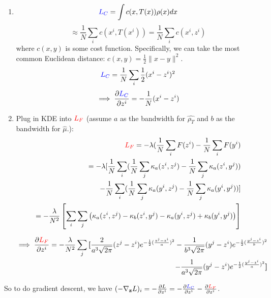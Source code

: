 \documentclass[11pt]{article}
\begin{document}
\begin{enumerate}
    \begin{enumerate}
        \item 
        $$
        \textcolor{blue}{L_C} = \int c(x,T(x)) \rho(x) dx
        $$
        $$
        \approx \frac{1}{N} \sum_i c(x^i,T(x^i))
        = \frac{1}{N} \sum_i c(x^i,z^i)
        $$
        where $c(x,y)$ is some cost function. Specifically, we can take the most common Euclidean distance: $c(x,y) = \frac{1}{2} \|x-y\|^2$.
        $$
        \textcolor{blue}{L_C} = \frac{1}{N} \sum_i \frac{1}{2}(x^i-z^i)^2
        $$
        \begin{align*}
            \implies \frac{\partial \textcolor{blue}{L_C}}{\partial z^i}
            = - \frac{1}{N}(x^i-z^i)
        \end{align*}
        
        \item Plug in KDE into $\textcolor{red}{L_F}$ (assume $a$ as the bandwidth for $\hat{\rho_T}$ and $b$ as the bandwidth for $\hat{\mu}$.):
        \begin{align*}
            \textcolor{red}{L_F} = - \lambda (\frac{1}{N} \sum_i F(z^i) - \frac{1}{N} \sum_i F(y^i)\\
            = - \lambda [\frac{1}{N} \sum_i (\frac{1}{N} \sum_j \kappa_a(z^i,z^j) - \frac{1}{N} \sum_j \kappa_a(z^i,y^j))\\
            - \frac{1}{N} \sum_i (\frac{1}{N} \sum_j \kappa_a(y^i,z^j) - \frac{1}{N} \sum_j \kappa_a(y^i,y^j))]\\
            = - \frac{\lambda}{N^2} \left[\sum_i \sum_j \left( 
            \kappa_a(z^i,z^j) - \kappa_b(z^i,y^j) - \kappa_a(y^i,z^j) + \kappa_b(y^i,y^j)
            \right) \right]
        \end{align*}
        
        \begin{align*}
            \implies \frac{\partial \textcolor{red}{L_F}}{\partial z^i}
            = - \frac{\lambda}{N^2} \sum_j \textbf{[}
            \frac{2}{a^3\sqrt{2\pi}} (z^j-z^i) e^{-\frac{1}{2}(\frac{z^j-z^i}{a})^2} - \frac{1}{b^3\sqrt{2\pi}} (y^j-z^i) e^{-\frac{1}{2}(\frac{y^j-z^i}{b})^2} \\
            - \frac{1}{a^3\sqrt{2\pi}} (y^j-z^i) e^{-\frac{1}{2}(\frac{y^j-z^i}{a})^2} \textbf{]}
        \end{align*}
        
    \end{enumerate}
    
    So to do gradient descent, we have $(-\nabla_{\mathbf{z}} L)_i =  -\frac{\partial L}{\partial z^i} = -  \frac{\partial \textcolor{blue}{L_C}}{\partial z^i} -  \frac{\partial \textcolor{red}{L_F}}{\partial z^i}$.
    
\end{enumerate}
\end{document}
